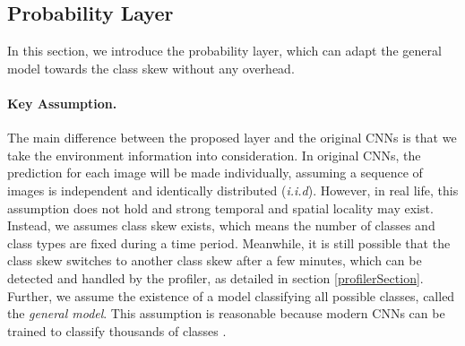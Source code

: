 \documentclass[pageno]{jpaper}
\begin{document}
\subsection{Probability Layer}
In this section, we introduce the probability layer, which can adapt the general model towards the class skew without any overhead.

\paragraph{Key Assumption.} 
The main difference between the proposed layer and the original CNNs is that we take the environment information into consideration. In original CNNs, the prediction for each image will be made individually, assuming a sequence of images is independent and identically distributed (\textit{i.i.d}). However, in real life, this assumption does not hold and strong temporal and spatial locality may exist. Instead, we assumes class skew exists, which means the number of classes and class types are fixed during a time period. Meanwhile, it is still possible that the class skew switches to another class skew after a few minutes, which can be detected and handled by the profiler, as detailed in section \ref{profilerSection}. Further, we assume the existence of a model classifying all possible classes, called the \textit{general model}. This assumption is reasonable because modern CNNs can be trained to classify thousands of classes \cite{krizhevsky2012imagenet, simonyan2014very, szegedy2015going, he2016deep, huang2017densely}.
\end{document}
